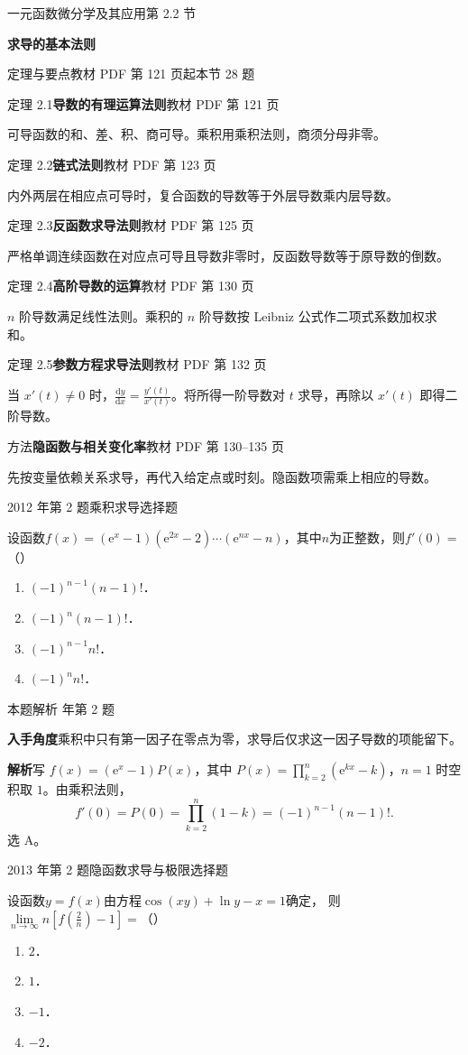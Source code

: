 \documentclass[UTF8,zihao=-4,fontset=fandol]{ctexart}
\renewcommand{\lim}{\operatorname*{lim}\limits}
\newcommand{\SectionHeading}[4]{%
  \clearpage\hypertarget{sec-#1}{}%
  {\small\textcolor{accent}{#2\hfill 第 #1 节}}\par\medskip
  {\LARGE\bfseries #3}\par\smallskip
  {\small\textcolor{muted}{#4}}\par\bigskip}
\newcommand{\Theory}[4]{%
  {\small\textcolor{accent}{#1}\quad\textbf{#3}\hfill\textcolor{muted}{教材 PDF 第 #2 页}}\par
  {\small #4}\par\smallskip}
\newcommand{\pickout}{\hfill（\hspace{1.4em}）}
\newenvironment{abcd}{\begin{enumerate}[label=\textup{(\Alph*)},leftmargin=2.3em,itemsep=1pt,topsep=4pt,parsep=1pt]}{\end{enumerate}}
\newcommand{\QuestionPage}[6]{%
  \par\noindent\begin{minipage}{\linewidth}
  \raggedright
  {\small\textcolor{black!60}{#3\quad #5}\hfill\textcolor{accent}{#2}}\par\smallskip}
\newcommand{\QuestionEnd}{\end{minipage}\par\medskip}
\newcommand{\QuestionPage}[6]{%
  \clearpage
  {\small\textcolor{accent}{#1\hfill #2}}\par\medskip
  {\small\textcolor{black!60}{#3\quad #5\hfill #6}}\par\vspace{9bp}}
\newcommand{\QuestionEnd}{}
\newenvironment{QuestionSolution}[1]{%
  \clearpage
  {\small\textcolor{black!60}{本题解析\quad #1}}\par\medskip
}{\par\clearpage}
\begin{document}
\SectionHeading{2.2}{一元函数微分学及其应用}{求导的基本法则}{定理与要点\quad 教材 PDF 第 121 页起\hfill 本节 28 题}
\Theory{定理 2.1}{121}{导数的有理运算法则}{可导函数的和、差、积、商可导。乘积用乘积法则，商须分母非零。}
\Theory{定理 2.2}{123}{链式法则}{内外两层在相应点可导时，复合函数的导数等于外层导数乘内层导数。}
\Theory{定理 2.3}{125}{反函数求导法则}{严格单调连续函数在对应点可导且导数非零时，反函数导数等于原导数的倒数。}
\Theory{定理 2.4}{130}{高阶导数的运算}{\(n\) 阶导数满足线性法则。乘积的 \(n\) 阶导数按 Leibniz 公式作二项式系数加权求和。}
\Theory{定理 2.5}{132}{参数方程求导法则}{当 \(x'(t)\ne0\) 时，\(\frac{\mathrm{d}y}{\mathrm{d}x}=\frac{y'(t)}{x'(t)}\)。将所得一阶导数对 \(t\) 求导，再除以 \(x'(t)\) 即得二阶导数。}
\Theory{方法}{130--135}{隐函数与相关变化率}{先按变量依赖关系求导，再代入给定点或时刻。隐函数项需乘上相应的导数。}
\QuestionPage{2.2 求导的基本法则}{选择题}{2012 年第 2 题}{1}{乘积求导}{056 / 234}
设函数$f(x) = (\mathrm{e}^x - 1)(\mathrm{e}^{2x} - 2) \cdots(\mathrm{e}^{nx} - n)$，其中$n$为正整数，则$f'(0) =$\pickout{}
\begin{abcd}
\item $(- 1)^{n - 1}(n - 1)!$．
\item $(- 1)^n(n - 1)!$．
\item $(- 1)^{n - 1} n!$．
\item $(- 1)^n n!$．
\end{abcd}
\QuestionEnd

\begin{QuestionSolution}{2012 年第 2 题}
\textbf{入手角度}\quad 乘积中只有第一因子在零点为零，求导后仅求这一因子导数的项能留下。

\textbf{解析}\quad 写 \(f(x)=(\mathrm{e}^x-1)P(x)\)，其中 \(P(x)=\prod_{k=2}^n(\mathrm{e}^{kx}-k)\)，\(n=1\) 时空积取 \(1\)。由乘积法则，
\[
f'(0)=P(0)=\prod_{k=2}^n(1-k)=(-1)^{n-1}(n-1)!.
\]
选 A。
\end{QuestionSolution}

\QuestionPage{2.2 求导的基本法则}{选择题}{2013 年第 2 题}{1}{隐函数求导与极限}{057 / 234}
设函数$y = f(x)$由方程$\cos (xy) + \ln y - x = 1$确定，
则$\lim_{n \to \infty} n\left[f\left(\frac{2}{n} \right) - 1 \right] =$\pickout{}
\begin{abcd}
\item $2$．
\item $1$．
\item $- 1$．
\item $- 2$．
\end{abcd}
\QuestionEnd
\end{document}
